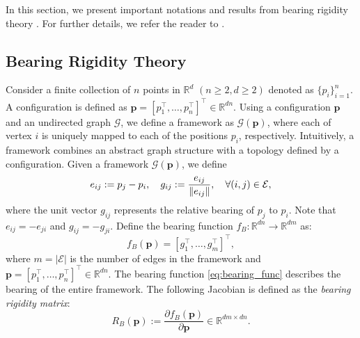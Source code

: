 In this section, we present important notations and results from bearing rigidity theory \cite{zhao2015bearing, trinh2019minimal}. For further details, we refer the reader to \cite{michieletto2021unified}.
\subsection{Bearing Rigidity Theory}
Consider a finite collection of $n$ points in $\mathbb{R}^d$ $(n\geq2, d\geq2)$ denoted as $\{p_i\}_{i=1}^n$. A configuration is defined as $\mathbf{p} = [p_1^\top, \dots, p_n^\top]^\top \in \mathbb{R}^{dn}$. Using a configuration $\mathbf{p}$ and an undirected graph $\mathcal{G}$, we define a framework as  
$\mathcal{G}(\mathbf{p})$, where each of vertex $i$ is uniquely mapped to each of the positions $p_i$, respectively.
Intuitively, a framework combines an abstract graph structure with a topology defined by a configuration. Given a framework $\mathcal{G}(\mathbf{p})$, we define
\begin{equation}
    \label{eq:bearing}
    e_{ij}:=p_j - p_i, \quad g_{ij}:= \frac{e_{ij}}{\lVert e_{ij}\rVert}, \quad \forall (i,j) \in \mathcal{E},
\end{equation}
where the unit vector $g_{ij}$ represents the relative bearing of $p_j$ to $p_i$. Note that $e_{ij} = -e_{ji}$ and $g_{ij} = - g_{ji}$. %
Define the bearing function $f_{B}: \mathbb{R}^{dn} \rightarrow \mathbb{R}^{dm}$ as: 
\begin{equation}
    \label{eq:bearing_func}
    f_B(\mathbf{p}) = [g_1^\top, \dots, g_m^\top]^\top,
\end{equation}
where $m=|\mathcal{E}|$ is the number of edges in the framework and $\mathbf{p} = [p_1^\top, \dots, p_n^\top]^\top \in \mathbb{R}^{dn}$.
The bearing function \eqref{eq:bearing_func} describes the bearing of the entire framework. The following Jacobian is defined as the \textit{bearing rigidity matrix}: 
\begin{equation}
    \label{eq:bearing_matrix}
    R_B(\mathbf{p}):= \frac{\partial f_B(\mathbf{p})}{\partial \mathbf{p}} \in \mathbb{R}^{dm\times dn}.
\end{equation}
